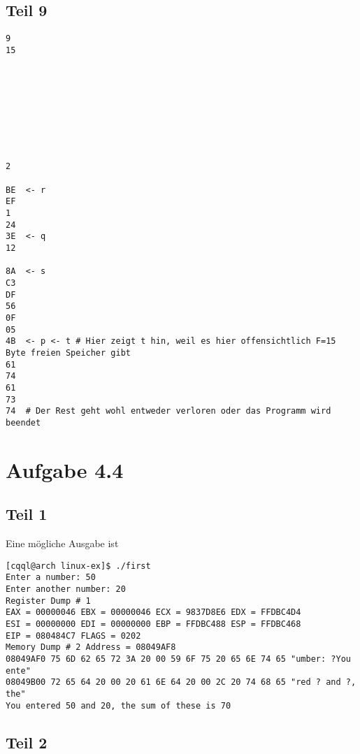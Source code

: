 \documentclass[10pt,a4paper]{article}
\begin{document}
\subsection*{Teil 9}

\lstset{
basicstyle=\footnotesize,       %
numbers=left,                   %
}
\begin{lstlisting}
9
15









2

BE  <- r
EF
1
24
3E  <- q
12

8A  <- s
C3
DF
56
0F
05
4B  <- p <- t # Hier zeigt t hin, weil es hier offensichtlich F=15 Byte freien Speicher gibt
61
74
61
73
74  # Der Rest geht wohl entweder verloren oder das Programm wird beendet
\end{lstlisting}

\section*{Aufgabe 4.4}

\subsection*{Teil 1}

Eine mögliche Ausgabe ist

\begin{lstlisting}
[cqql@arch linux-ex]$ ./first 
Enter a number: 50
Enter another number: 20
Register Dump # 1
EAX = 00000046 EBX = 00000046 ECX = 9837D8E6 EDX = FFDBC4D4
ESI = 00000000 EDI = 00000000 EBP = FFDBC488 ESP = FFDBC468
EIP = 080484C7 FLAGS = 0202                     
Memory Dump # 2 Address = 08049AF8
08049AF0 75 6D 62 65 72 3A 20 00 59 6F 75 20 65 6E 74 65 "umber: ?You ente"
08049B00 72 65 64 20 00 20 61 6E 64 20 00 2C 20 74 68 65 "red ? and ?, the"
You entered 50 and 20, the sum of these is 70
\end{lstlisting}

\subsection*{Teil 2}
\end{document}
